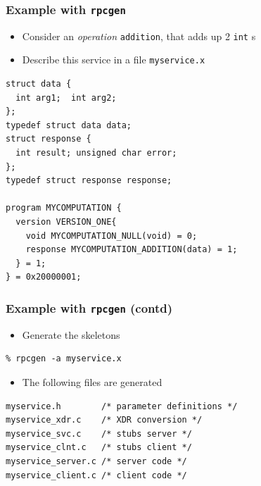 \documentclass[bigger,hyperref={colorlinks=true, urlcolor=red, plainpages=false, pdfpagelabels, bookmarksnumbered}]{beamer}
\begin{document}
\begin{frame}[fragile]
\frametitle{Example with \texttt{rpcgen}}
\label{sec-2-16}

\begin{itemize}
\item Consider an \emph{operation} \texttt{addition}, that adds up 2 \texttt{int} s
\item Describe this service in a file \texttt{myservice.x}
\end{itemize}

\lstset{language=C}
\begin{lstlisting}
struct data {
  int arg1;  int arg2;
};
typedef struct data data;
struct response {
  int result; unsigned char error;
};
typedef struct response response;

program MYCOMPUTATION {
  version VERSION_ONE{
    void MYCOMPUTATION_NULL(void) = 0;
    response MYCOMPUTATION_ADDITION(data) = 1;
  } = 1;
} = 0x20000001;
\end{lstlisting}
\end{frame}
\begin{frame}[fragile]
\frametitle{Example with \texttt{rpcgen} (contd)}
\label{sec-2-17}

\begin{itemize}
\item Generate the skeletons
\end{itemize}

\lstset{language=C}
\begin{lstlisting}
% rpcgen -a myservice.x
\end{lstlisting}
\begin{itemize}
\item The following files are generated
\end{itemize}

\lstset{language=C}
\begin{lstlisting}
myservice.h        /* parameter definitions */
myservice_xdr.c    /* XDR conversion */
myservice_svc.c    /* stubs server */   
myservice_clnt.c   /* stubs client */
myservice_server.c /* server code */
myservice_client.c /* client code */
\end{lstlisting}
\end{frame}
\end{document}
